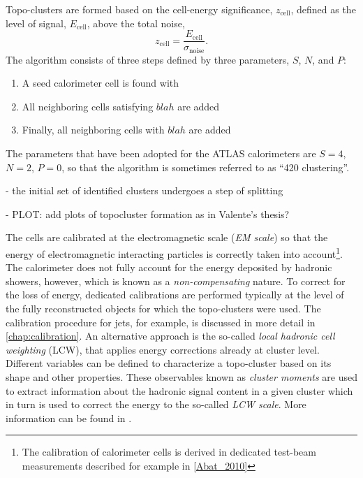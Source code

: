 Topo-clusters are formed based on the cell-energy significance, $z_{\text{cell}}$, defined as the level of signal, $E_{\text{cell}}$, above the total noise, 
\begin{equation}
    z_{\text{cell}} = \frac{E_{\text{cell}}}{\sigma_{\text{noise}}}. 
\end{equation}
The algorithm consists of three steps defined by three parameters, $S$, $N$, and $P$:

\begin{enumerate}
    \item A seed calorimeter cell is found with 
    \item All neighboring cells satisfying $blah$ are added
    \item Finally, all neighboring cells with $blah$ are added
\end{enumerate}

The parameters that have been adopted for the ATLAS calorimeters are $S = 4$, $N = 2$, $P = 0$, so that the algorithm is sometimes referred to as ``420 clustering''. 

- the initial set of identified clusters undergoes a step of splitting

- PLOT: add plots of topocluster formation as in Valente's thesis?


The cells are calibrated at the electromagnetic scale (\emph{EM scale}) so that the energy of electromagnetic interacting particles is correctly taken into account\footnote{The calibration of calorimeter cells is derived in dedicated test-beam measurements described for example in \cref{Abat_2010}}. The calorimeter does not fully account for the energy deposited by hadronic showers, however, which is known as a \emph{non-compensating} nature.
To correct for the loss of energy, dedicated calibrations are performed typically at the level of the fully reconstructed objects for which the topo-clusters were used. The calibration procedure for jets, for example, is discussed in more detail in \cref{chap:calibration}.
An alternative approach is the so-called \emph{local hadronic cell weighting} (LCW), that applies energy corrections already at cluster level. Different variables can be defined to characterize a topo-cluster based on its shape and other properties. These observables known as \emph{cluster moments} are used to extract information about the hadronic signal content in a given cluster which in turn is used to correct the energy to the so-called \emph{LCW scale}. More information can be found in .



